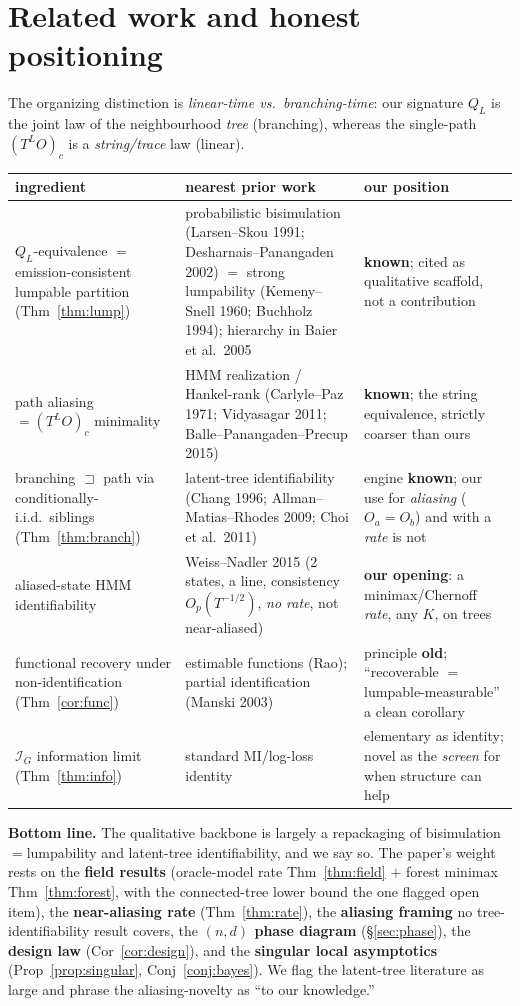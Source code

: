 \documentclass[11pt]{article}
\begin{document}
\section{Related work and honest positioning}\label{sec:related}
The organizing distinction is \emph{linear-time vs.\ branching-time}: our signature $Q_L$ is the joint law of the
neighbourhood \emph{tree} (branching), whereas the single-path $(T^{L}O)_c$ is a \emph{string/trace} law (linear).
\begin{center}\small
\begin{tabular}{p{4.6cm}p{4.9cm}p{4.4cm}}
\toprule
ingredient & nearest prior work & our position \\ \midrule
$Q_L$-equivalence $=$ emission-consistent lumpable partition (Thm~\ref{thm:lump}) &
probabilistic bisimulation (Larsen--Skou 1991; Desharnais--Panangaden 2002) $=$ strong lumpability (Kemeny--Snell
1960; Buchholz 1994); hierarchy in Baier et al.\ 2005 & \textbf{known}; cited as qualitative scaffold, not a
contribution \\
path aliasing $=(T^{L}O)_c$ minimality & HMM realization / Hankel-rank (Carlyle--Paz 1971; Vidyasagar 2011;
Balle--Panangaden--Precup 2015) & \textbf{known}; the string equivalence, strictly coarser than ours \\
branching $\sqsupset$ path via conditionally-i.i.d.\ siblings (Thm~\ref{thm:branch}) & latent-tree identifiability
(Chang 1996; Allman--Matias--Rhodes 2009; Choi et al.\ 2011) & engine \textbf{known}; our use for
\emph{aliasing} ($O_a{=}O_b$) and with a \emph{rate} is not \\
aliased-state HMM identifiability & Weiss--Nadler 2015 (2 states, a line, consistency $O_p(T^{-1/2})$, \emph{no
rate}, not near-aliased) & \textbf{our opening}: a minimax/Chernoff \emph{rate}, any $K$, on trees \\
functional recovery under non-identification (Thm~\ref{cor:func}) & estimable functions (Rao); partial
identification (Manski 2003) & principle \textbf{old}; ``recoverable $=$ lumpable-measurable'' a clean corollary \\
$\mathcal I_G$ information limit (Thm~\ref{thm:info}) & standard MI/log-loss identity & elementary as identity;
novel as the \emph{screen} for when structure can help \\
\bottomrule
\end{tabular}
\end{center}
\noindent\textbf{Bottom line.} The qualitative backbone is largely a repackaging of bisimulation$=$lumpability and
latent-tree identifiability, and we say so. The paper's weight rests on the \textbf{field results}
(oracle-model rate Thm~\ref{thm:field} $+$ forest minimax Thm~\ref{thm:forest}, with the connected-tree lower
bound the one flagged open item), the \textbf{near-aliasing rate} (Thm~\ref{thm:rate}), the \textbf{aliasing
framing} no tree-identifiability result covers, the \textbf{$(n,d)$ phase diagram} (\S\ref{sec:phase}), the
\textbf{design law} (Cor~\ref{cor:design}), and the \textbf{singular local asymptotics}
(Prop~\ref{prop:singular}, Conj~\ref{conj:bayes}). We flag the latent-tree literature as large and phrase the
aliasing-novelty as ``to our knowledge.''
\end{document}
